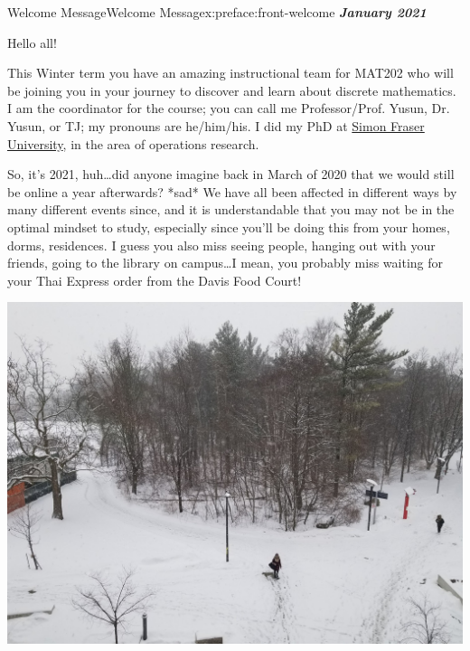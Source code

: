 \documentclass[oneside,10pt,]{book}
\newcommand{\alert}[1]{\textbf{\textit{#1}}}
\numberwithin{equation}{section}
\begin{document}
\par\medskip
{}
\null\clearpage
%
%
\typeout{************************************************}
\typeout{************************************************}
%
\begin{preface}{Welcome Message}{}{Welcome Message}{}{}{x:preface:front-welcome}
\alert{January 2021}%
\par
Hello all!%
\par

This Winter term you have an amazing instructional team for MAT202 who will be joining you in your journey to discover and learn about discrete mathematics. I am the coordinator for the course; you can call me Professor\slash{}Prof. Yusun, Dr. Yusun, or TJ; my pronouns are he\slash{}him\slash{}his. I did my PhD at \href{https://sfu.ca}{Simon Fraser University}, in the area of operations research.%
\par
So, it's 2021, huh\dots did anyone imagine back in March of 2020 that we would still be online a year afterwards? *sad* We have all been affected in different ways by many different events since, and it is understandable that you may not be in the optimal mindset to study, especially since you'll be doing this from your homes, dorms, residences. I guess you also miss seeing people, hanging out with your friends, going to the library on campus\dots I mean, you probably miss waiting for your Thai Express order from the Davis Food Court!
\begin{sidebyside}{1}{0.15}{0.15}{0}%
\begin{sbspanel}{0.6}%
\includegraphics[width=\linewidth]{figs/UTMwinter.jpg}

\end{sbspanel}
\end{sidebyside}
\end{preface}
\end{document}
